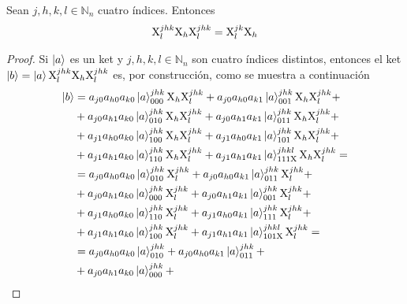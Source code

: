 \begin{proposition}
  Sean $j,h,k,l \in \mathbb{N}_n$ cuatro índices.
  Entonces
  \begin{equation}
    \label{eq:mainresult}
    \text{X}^{jhk}_{l}\text{X}_h\text{X}^{jhk}_{l} = \text{X}^{jk}_{l}\text{X}_h
  \end{equation}
\end{proposition}
\begin{proof}
  Si $\ket{a}$ es un ket y $j,h,k,l \in \mathbb{N}_n$ son cuatro índices distintos, entonces
  el ket
  $\ket{b}=\ket{a}\text{X}^{jhk}_{l}\text{X}_h\text{X}^{jhk}_{l}$
  es, por construcción, como se muestra a continuación
  \begin{align*}
    \ket{b}
     & =a_{j0}a_{h0}a_{k0}\stateket{a}{jhk}{000}\gate{X}_h\stategate{X}{jhk}{l} +
    a_{j0}a_{h0}a_{k1}\stateket{a}{jhk}{001}\gate{X}_h\stategate{X}{jhk}{l}+          \\
     & +a_{j0}a_{h1}a_{k0}\stateket{a}{jhk}{010}\gate{X}_h\stategate{X}{jhk}{l} +
    a_{j0}a_{h1}a_{k1}\stateket{a}{jhk}{011}\gate{X}_h\stategate{X}{jhk}{l}+          \\
     & +a_{j1}a_{h0}a_{k0}\stateket{a}{jhk}{100}\gate{X}_h\stategate{X}{jhk}{l} +
    a_{j1}a_{h0}a_{k1}\stateket{a}{jhk}{101}\gate{X}_h\stategate{X}{jhk}{l}+          \\
     & +a_{j1}a_{h1}a_{k0}\stateket{a}{jhk}{110}\gate{X}_h\stategate{X}{jhk}{l} +
    a_{j1}a_{h1}a_{k1}\stateket{a}{jhkl}{111\gate{X}}\gate{X}_h\stategate{X}{jhk}{l}= \\
     & =a_{j0}a_{h0}a_{k0}\stateket{a}{jhk}{010}\stategate{X}{jhk}{l} +
    a_{j0}a_{h0}a_{k1}\stateket{a}{jhk}{011}\stategate{X}{jhk}{l}+                    \\
     & +a_{j0}a_{h1}a_{k0}\stateket{a}{jhk}{000}\stategate{X}{jhk}{l} +
    a_{j0}a_{h1}a_{k1}\stateket{a}{jhk}{001}\stategate{X}{jhk}{l}+                    \\
     & +a_{j1}a_{h0}a_{k0}\stateket{a}{jhk}{110}\stategate{X}{jhk}{l} +
    a_{j1}a_{h0}a_{k1}\stateket{a}{jhk}{111}\stategate{X}{jhk}{l}+                    \\
     & +a_{j1}a_{h1}a_{k0}\stateket{a}{jhk}{100}\stategate{X}{jhk}{l} +
    a_{j1}a_{h1}a_{k1}\stateket{a}{jhkl}{101\gate{X}}\stategate{X}{jhk}{l}=           \\
     & =a_{j0}a_{h0}a_{k0}\stateket{a}{jhk}{010} +
    a_{j0}a_{h0}a_{k1}\stateket{a}{jhk}{011}+                                         \\
     & +a_{j0}a_{h1}a_{k0}\stateket{a}{jhk}{000} +

\end{align*}
\end{proof}
